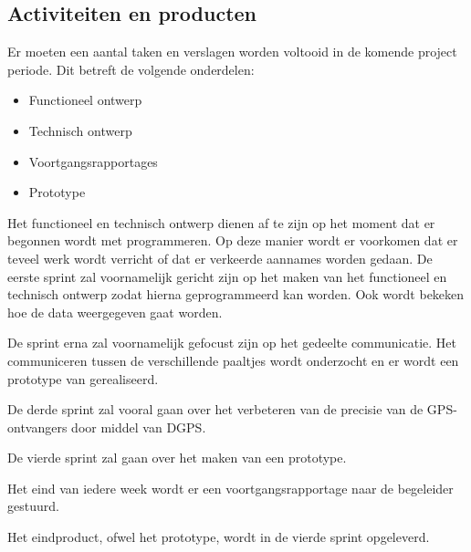 \subsection{Activiteiten en producten}
Er moeten een aantal taken en verslagen worden voltooid in de komende
project periode. Dit betreft de volgende onderdelen:
\begin{itemize}
    \item Functioneel ontwerp
    \item Technisch ontwerp
    \item Voortgangsrapportages
    \item Prototype
\end{itemize}
Het functioneel en technisch ontwerp dienen af te zijn op het moment dat
er begonnen wordt met programmeren. Op deze manier wordt er voorkomen
dat er teveel werk wordt verricht of dat er verkeerde aannames worden
gedaan. De eerste sprint zal voornamelijk gericht zijn op het maken van
het functioneel en technisch ontwerp zodat hierna geprogrammeerd kan
worden. Ook wordt bekeken hoe de data weergegeven gaat worden.

De sprint erna zal voornamelijk gefocust zijn op het gedeelte communicatie.
Het communiceren tussen de verschillende paaltjes wordt onderzocht en er
wordt een prototype van gerealiseerd.

De derde sprint zal vooral gaan over het verbeteren van de precisie van de
GPS-ontvangers door middel van DGPS.

De vierde sprint zal gaan over het maken van een prototype.

Het eind van iedere week wordt er een voortgangsrapportage naar de begeleider
gestuurd.

Het eindproduct, ofwel het prototype, wordt in de vierde sprint opgeleverd.
